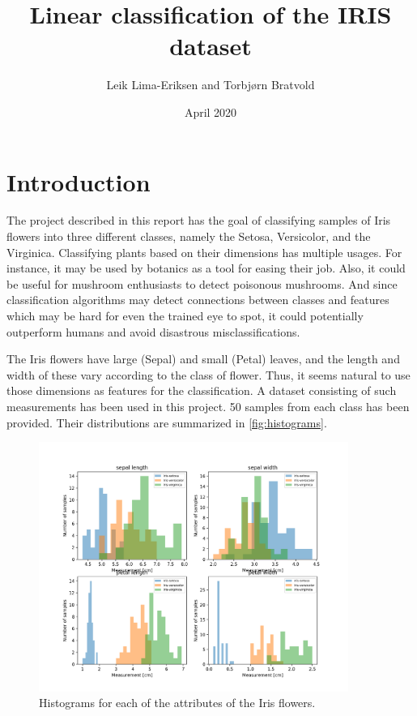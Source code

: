 \documentclass{article}
\begin{document}
\title{Linear classification of the IRIS dataset}
\author{Leik Lima-Eriksen and Torbjørn Bratvold}
\date{April 2020}

\maketitle

\section{Introduction}\label{sec:introduction}
The project described in this report has the goal of classifying samples of Iris flowers into
three different classes, namely the Setosa, Versicolor, and the Virginica. Classifying plants
based on their dimensions has multiple usages. For instance, it may be used by botanics as a tool
for easing their job. Also, it could be useful for mushroom enthusiasts to detect poisonous
mushrooms. And since classification algorithms may detect connections between classes and features
which may be hard for even the trained eye to spot, it could potentially outperform humans and
avoid disastrous misclassifications.

The Iris flowers have large (Sepal) and small (Petal) leaves, and the length and width of these
vary according to the class of flower. Thus, it seems natural to use those dimensions as features
for the classification. A dataset consisting of such measurements has been used in this project. 50
samples from each class has been provided. Their distributions are summarized in \autoref{fig:histograms}.

\begin{figure}
    \centering
    \includegraphics[width=0.9\textwidth]{../images/iris_histograms.png}
    \caption{Histograms for each of the attributes of the Iris flowers.}
    \label{fig:histograms}
\end{figure}
\end{document}
